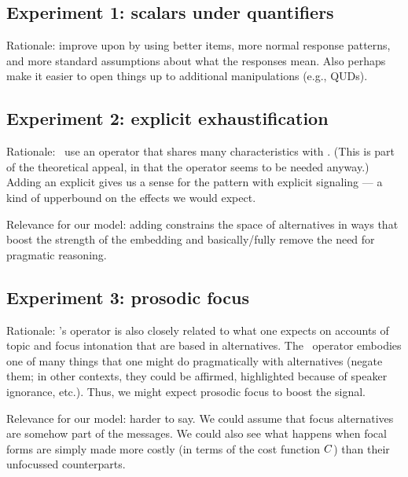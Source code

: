 \documentclass{article}
\begin{document}

\subsection{Experiment 1: scalars under quantifiers}\label{sec:exp1}

\begin{examples}
\item Rationale: improve upon \citet{Chemla:Spector:2011} by using
  better items, more normal response patterns, and more standard
  assumptions about what the responses mean. Also perhaps make it
  easier to open things up to additional manipulations (e.g., QUDs).
\end{examples}


\subsection{Experiment 2: explicit exhaustification}\label{sec:exp2}

\begin{examples}
\item Rationale: \CFS\ use an operator that shares many
  characteristics with . (This is part of the theoretical
  appeal, in that the operator seems to be needed anyway.)  Adding an
  explicit  gives us a sense for the pattern with explicit
  signaling --- a kind of upperbound on the effects we would expect.

\item Relevance for our model: adding  constrains the space
  of alternatives in ways that boost the strength of the embedding and
  basically/fully remove the need for pragmatic reasoning.  
\end{examples}


\subsection{Experiment 3: prosodic focus}\label{sec:exp3}

\begin{examples}
\item Rationale: \CFS's operator is also closely related to what one
  expects on accounts of topic and focus intonation that are based in
  alternatives. The \ALT\ operator embodies one of many things that
  one might do pragmatically with alternatives (negate them; in other
  contexts, they could be affirmed, highlighted because of speaker
  ignorance, etc.). Thus, we might expect prosodic focus to boost the
  signal.

\item Relevance for our model: harder to say. We could assume that
  focus alternatives are somehow part of the messages. We could also
  see what happens when focal forms are simply made more costly (in
  terms of the cost function $C$) than their unfocussed
  counterparts.
\end{examples}




\end{document}
